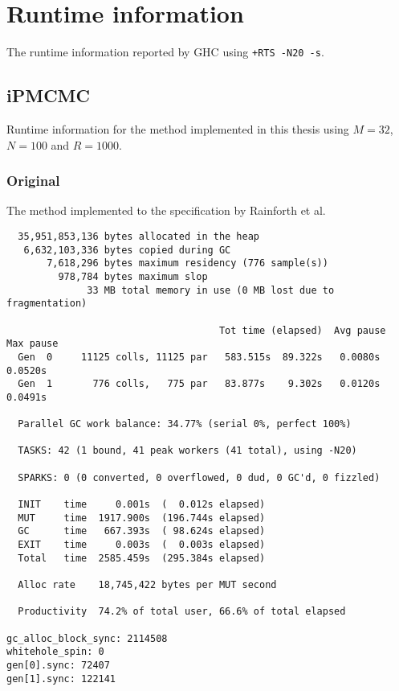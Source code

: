 \onecolumn
\appendix

\section{Runtime information}
\label{sec:runtime}

The runtime information reported by GHC using \texttt{+RTS -N20 -s}.

\subsection{iPMCMC}
\label{sub:ipmcmc_original}

Runtime information for the method implemented in this thesis using $M=32$, $N=100$ and $R=1000$.

\subsubsection{Original}
\label{ssub:original}

The method implemented to the specification by Rainforth et al.
\begin{verbatim}
  35,951,853,136 bytes allocated in the heap
   6,632,103,336 bytes copied during GC
       7,618,296 bytes maximum residency (776 sample(s))
         978,784 bytes maximum slop
              33 MB total memory in use (0 MB lost due to fragmentation)

                                     Tot time (elapsed)  Avg pause  Max pause
  Gen  0     11125 colls, 11125 par   583.515s  89.322s   0.0080s    0.0520s
  Gen  1       776 colls,   775 par   83.877s    9.302s   0.0120s    0.0491s

  Parallel GC work balance: 34.77% (serial 0%, perfect 100%)

  TASKS: 42 (1 bound, 41 peak workers (41 total), using -N20)

  SPARKS: 0 (0 converted, 0 overflowed, 0 dud, 0 GC'd, 0 fizzled)

  INIT    time     0.001s  (  0.012s elapsed)
  MUT     time  1917.900s  (196.744s elapsed)
  GC      time   667.393s  ( 98.624s elapsed)
  EXIT    time     0.003s  (  0.003s elapsed)
  Total   time  2585.459s  (295.384s elapsed)

  Alloc rate    18,745,422 bytes per MUT second

  Productivity  74.2% of total user, 66.6% of total elapsed

gc_alloc_block_sync: 2114508
whitehole_spin: 0
gen[0].sync: 72407
gen[1].sync: 122141
\end{verbatim}



